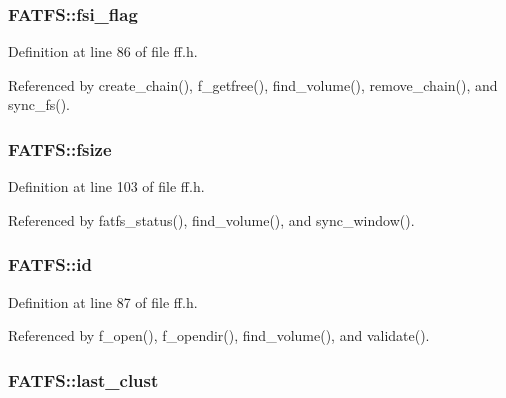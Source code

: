 \hypertarget{structFATFS_a84e9cdc5a6a8e33ea7ec192058abf161}{
\subsubsection[{fsi\-\_\-flag}]{ F\-A\-T\-F\-S\-::fsi\-\_\-flag}}\label{structFATFS_a84e9cdc5a6a8e33ea7ec192058abf161}


Definition at line 86 of file ff.\-h.



Referenced by create\-\_\-chain(), f\-\_\-getfree(), find\-\_\-volume(), remove\-\_\-chain(), and sync\-\_\-fs().

\hypertarget{structFATFS_a53e9560659f14e66f306c2c444198bf3}{
\subsubsection[{fsize}]{ F\-A\-T\-F\-S\-::fsize}}\label{structFATFS_a53e9560659f14e66f306c2c444198bf3}


Definition at line 103 of file ff.\-h.



Referenced by fatfs\-\_\-status(), find\-\_\-volume(), and sync\-\_\-window().

\hypertarget{structFATFS_a417095d7c20d56d417dc0998e0dd5a5c}{
\subsubsection[{id}]{ F\-A\-T\-F\-S\-::id}}\label{structFATFS_a417095d7c20d56d417dc0998e0dd5a5c}


Definition at line 87 of file ff.\-h.



Referenced by f\-\_\-open(), f\-\_\-opendir(), find\-\_\-volume(), and validate().

\hypertarget{structFATFS_ad315def289218e26ab78ff90fde700d1}{
\subsubsection[{last\-\_\-clust}]{ F\-A\-T\-F\-S\-::last\-\_\-clust}}\label{structFATFS_ad315def289218e26ab78ff90fde700d1}


